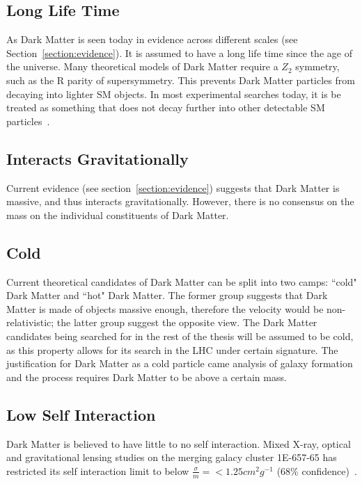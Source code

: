 \subsection{Long Life Time}
As Dark Matter is seen today in evidence across different scales (see Section~\ref{section:evidence}). It is assumed to have a long life time since the age of the universe. Many theoretical models of Dark Matter require a $Z_{2}$ symmetry, such as the R parity of supersymmetry. This prevents Dark Matter particles from decaying into lighter SM objects. In most experimental searches today, it is be treated as something that does not decay further into other detectable SM
particles~\cite{boveia2018dark}.

\subsection{Interacts Gravitationally}
Current evidence (see section~\ref{section:evidence}) suggests that Dark Matter is massive, and thus interacts gravitationally. However, there is no consensus on the mass on the individual constituents of Dark Matter. 

\subsection{Cold}
Current theoretical candidates of Dark Matter can be split into two camps: ``cold" Dark Matter and ``hot" Dark Matter. The former group suggests that Dark Matter is made of objects massive enough, therefore the velocity would be non-relativistic; the latter group suggest the opposite view. The Dark Matter candidates being searched for in the rest of the thesis will be assumed to be cold, as this property allows for its search in the LHC under certain signature. The justification for Dark Matter as a cold particle came analysis of galaxy formation and the process requires Dark Matter to be above a certain mass. 

\subsection{Low Self Interaction}
Dark Matter is believed to have little to no self interaction. Mixed X-ray, optical and gravitational lensing studies on the merging galacy cluster 1E-657-65 has restricted its self interaction limit to below $\frac{\sigma}{m}= < 1.25 cm^{2} g^{-1}$ (68\% confidence)~\cite{randall2008constraints}. 
 


